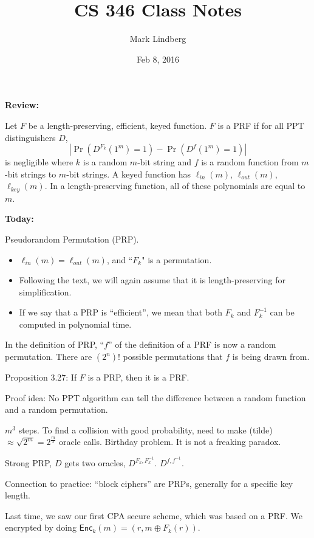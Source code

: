 \documentclass[12pt]{article}
\newcommand{\Enc}{\mathsf{Enc}}
\newcommand{\Encrypt}[2]{\Enc_{#1}(#2)}
\newcommand{\xor}{\oplus}
\begin{document}
\title{CS 346 Class Notes}
\date{Feb 8, 2016}
\author{Mark Lindberg}
\maketitle
\thispagestyle{fancy}

{\bf Review:}

Let $F$ be a length-preserving, efficient, keyed function. $F$ is a PRF if for all PPT distinguishers $D$, $$|\Pr(D^{F_k}(1^m)=1)-\Pr(D^{f}(1^m)=1)|$$ is negligible where $k$ is a random $m$-bit string and $f$ is a random function from $m$-bit strings to $m$-bit strings. A keyed function has $\ell_{in}(m)$, $\ell_{out}(m)$, $\ell_{key}(m)$. In a length-preserving function, all of these polynomials are equal to $m$.

{\bf Today:}

Pseudorandom Permutation (PRP).\begin{itemize}

\item $\ell_{in}(m)=\ell_{out}(m)$, and ``$F_k$" is a permutation.

\item Following the text, we will again assume that it is length-preserving for simplification.

\item If we say that a PRP is ``efficient'', we mean that both $F_k$ and $F_{k}^{-1}$ can be computed in polynomial time.

\end{itemize}

In the definition of PRP, ``$f$'' of the definition of a PRF is now a random permutation. There are $(2^{n})!$ possible permutations that $f$ is being drawn from.

Proposition 3.27: If $F$ is a PRP, then it is a PRF.

Proof idea: No PPT algorithm can tell the difference between a random function and a random permutation.

$m^3$ steps. To find a collision with good probability, need to make (tilde)$\approx\sqrt{2^m}=2^{\frac{m}{2}}$ oracle calls. Birthday problem. It is not a freaking paradox.

Strong PRP, $D$ gets two oracles, $D^{F_k,F_k^{-1}}$. $D^{f,f^{-1}}$.

Connection to practice: ``block ciphers'' are PRPs, generally for a specific key length.

Last time, we saw our first CPA secure scheme, which was based on a PRF. We encrypted by doing $\Encrypt{k}{m}=(r,m\xor F_k(r))$.
\end{document}
